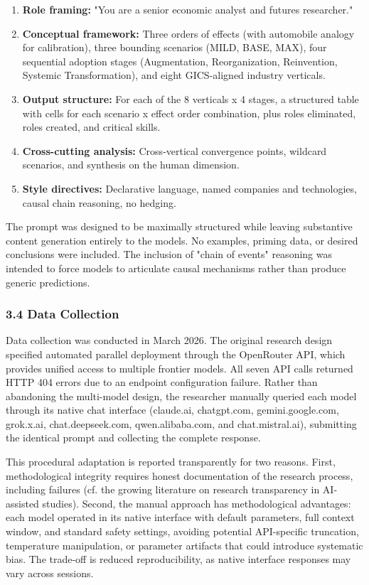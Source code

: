 \documentclass{article}
\begin{document}
\begin{enumerate}
  \item \textbf{Role framing:} "You are a senior economic analyst and futures researcher."
  \item \textbf{Conceptual framework:} Three orders of effects (with automobile analogy for calibration), three bounding scenarios (MILD, BASE, MAX), four sequential adoption stages (Augmentation, Reorganization, Reinvention, Systemic Transformation), and eight GICS-aligned industry verticals.
  \item \textbf{Output structure:} For each of the 8 verticals x 4 stages, a structured table with cells for each scenario x effect order combination, plus roles eliminated, roles created, and critical skills.
  \item \textbf{Cross-cutting analysis:} Cross-vertical convergence points, wildcard scenarios, and synthesis on the human dimension.
  \item \textbf{Style directives:} Declarative language, named companies and technologies, causal chain reasoning, no hedging.

\end{enumerate}
The prompt was designed to be maximally structured while leaving substantive content generation entirely to the models. No examples, priming data, or desired conclusions were included. The inclusion of "chain of events" reasoning was intended to force models to articulate causal mechanisms rather than produce generic predictions.


\subsubsection{3.4 Data Collection}
\label{sec:3_4_data_collection}

Data collection was conducted in March 2026. The original research design specified automated parallel deployment through the OpenRouter API, which provides unified access to multiple frontier models. All seven API calls returned HTTP 404 errors due to an endpoint configuration failure. Rather than abandoning the multi-model design, the researcher manually queried each model through its native chat interface (claude.ai, chatgpt.com, gemini.google.com, grok.x.ai, chat.deepseek.com, qwen.alibaba.com, and chat.mistral.ai), submitting the identical prompt and collecting the complete response.

This procedural adaptation is reported transparently for two reasons. First, methodological integrity requires honest documentation of the research process, including failures (cf. the growing literature on research transparency in AI-assisted studies). Second, the manual approach has methodological advantages: each model operated in its native interface with default parameters, full context window, and standard safety settings, avoiding potential API-specific truncation, temperature manipulation, or parameter artifacts that could introduce systematic bias. The trade-off is reduced reproducibility, as native interface responses may vary across sessions.
\end{document}
